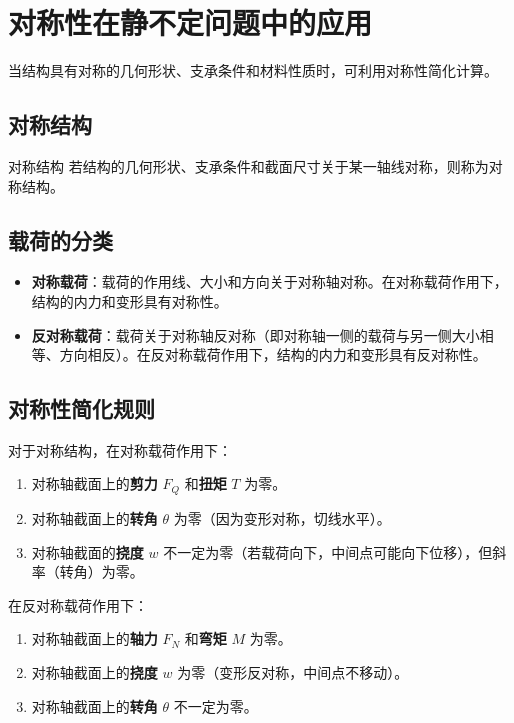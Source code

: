 \section{对称性在静不定问题中的应用}

当结构具有对称的几何形状、支承条件和材料性质时，可利用对称性简化计算。

\subsection{对称结构}
\begin{mydefinition}{对称结构}
    若结构的几何形状、支承条件和截面尺寸关于某一轴线对称，则称为对称结构。
\end{mydefinition}

\subsection{载荷的分类}
\begin{itemize}
    \item \textbf{对称载荷}：载荷的作用线、大小和方向关于对称轴对称。在对称载荷作用下，结构的内力和变形具有对称性。
    \item \textbf{反对称载荷}：载荷关于对称轴反对称（即对称轴一侧的载荷与另一侧大小相等、方向相反）。在反对称载荷作用下，结构的内力和变形具有反对称性。
\end{itemize}

\subsection{对称性简化规则}
对于对称结构，在对称载荷作用下：
\begin{enumerate}
    \item 对称轴截面上的\textbf{剪力} \(F_Q\) 和\textbf{扭矩} \(T\) 为零。
    \item 对称轴截面上的\textbf{转角} \(\theta\) 为零（因为变形对称，切线水平）。
    \item 对称轴截面的\textbf{挠度} \(w\) 不一定为零（若载荷向下，中间点可能向下位移），但斜率（转角）为零。
\end{enumerate}

在反对称载荷作用下：
\begin{enumerate}
    \item 对称轴截面上的\textbf{轴力} \(F_N\) 和\textbf{弯矩} \(M\) 为零。
    \item 对称轴截面上的\textbf{挠度} \(w\) 为零（变形反对称，中间点不移动）。
    \item 对称轴截面上的\textbf{转角} \(\theta\) 不一定为零。
\end{enumerate}

